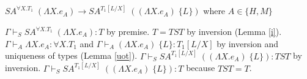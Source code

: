 \begin{case}
$SA^{\forall X.T_{1}}\;(\Lambda X.e_{A})\rightarrow SA^{T_{1}[L/X]}\;((\Lambda X.e_{A})\;\lbrace L\rbrace)$ where $A\in\lbrace H,M\rbrace$

$\Gamma\vdash_{S}SA^{\forall X.T_{1}}\;(\Lambda X.e_{A}):T$ by premise.  $T=TST$ by inversion (Lemma \ref{i}).  $\Gamma\vdash_{A}\Lambda X.e_{A}:\forall X.T_{1}$ and $\Gamma\vdash_{A}(\Lambda X.e_{A})\;\lbrace L\rbrace:T_{1}[L/X]$ by inversion and uniqueness of types (Lemma \ref{uot}).  $\Gamma\vdash_{S}SA^{T_{1}[L/X]}\;((\Lambda X.e_{A})\;\lbrace L\rbrace):TST$ by inversion.  $\Gamma\vdash_{S}SA^{T_{1}[L/X]}\;((\Lambda X.e_{A})\;\lbrace L\rbrace):T$ because $TST=T$.
\end{case}